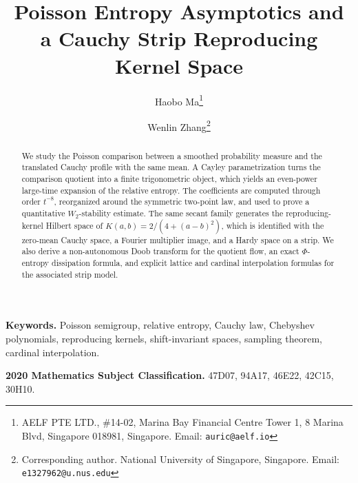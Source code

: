 \documentclass[12pt,a4paper]{article}
\title{Poisson Entropy Asymptotics and a Cauchy Strip Reproducing Kernel Space}
\author{
  Haobo Ma\thanks{AELF PTE LTD., \#14-02, Marina Bay Financial Centre Tower 1, 8 Marina Blvd, Singapore 018981, Singapore. Email: \texttt{auric@aelf.io}}
  \and
  Wenlin Zhang\thanks{Corresponding author. National University of Singapore, Singapore. Email: \texttt{e1327962@u.nus.edu}}
}
\date{}
\theoremstyle{plain}
\theoremstyle{definition}
\numberwithin{equation}{section}
\begin{document}
\maketitle

\begin{abstract}
We study the Poisson comparison between a smoothed probability measure
and the translated Cauchy profile with the same mean.  A Cayley
parametrization turns the comparison quotient into a finite
trigonometric object, which yields an even-power large-time expansion of
the relative entropy.  The coefficients are computed through order
$t^{-8}$, reorganized around the symmetric two-point law, and used to
prove a quantitative $W_2$-stability estimate.  The same secant family
generates the reproducing-kernel Hilbert space of
$K(a,b)=2/(4+(a-b)^2)$, which is identified with the zero-mean Cauchy
space, a Fourier multiplier image, and a Hardy space on a strip.  We also
derive a non-autonomous Doob transform for the quotient flow, an exact
$\Phi$-entropy dissipation formula, and explicit lattice and cardinal
interpolation formulas for the associated strip model.
\end{abstract}

\smallskip
\noindent\textbf{Keywords.}
Poisson semigroup, relative entropy, Cauchy law, Chebyshev
polynomials, reproducing kernels, shift-invariant spaces, sampling
theorem, cardinal interpolation.

\smallskip
\noindent\textbf{2020 Mathematics Subject Classification.}
47D07, 94A17, 46E22, 42C15, 30H10.








\appendix




\end{document}
